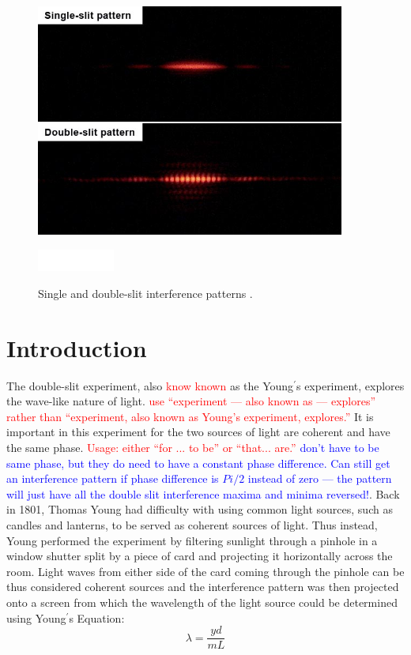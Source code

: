 \documentclass[prb,preprint]{revtex4-1}
\begin{document}
\begin{abstract}
\end{abstract}

\begin{figure}[b]
\centering
\includegraphics[width=4in]{image1.jpg}
\caption{Single and double-slit interference patterns \cite{wik}.}
\includegraphics[width=1in]{white.png}
\label{image}
\end{figure}

\maketitle 

\section{Introduction}
The double-slit experiment, also \textcolor{red}{know known} as the Young$^\prime$s experiment, explores the wave-like nature of light. \textcolor{red}{use ``experiment --- also known as --- explores'' rather than ``experiment, also known as Young's experiment, explores.''} It is important in this experiment for the two sources of light are coherent and have the same phase.\textcolor{red}{ Usage: either ``for ... to be'' or ``that... are.''} \textcolor{blue}{don't have to be same phase, but they do need to have a constant phase difference. Can still get an interference pattern if phase difference is $Pi/2$ instead of zero --- the pattern will just have all the double slit interference maxima and minima reversed!}. Back in 1801, Thomas Young had difficulty with using common light sources, such as candles and lanterns, to be served as coherent sources of light. Thus instead, Young performed the experiment by filtering sunlight through a pinhole in a window shutter split by a piece of card and projecting it horizontally across the room. Light waves from either side of the card coming through the pinhole can be thus considered coherent sources and the interference pattern was then projected onto a screen from which the wavelength of the light source could be determined using Young$^\prime$s Equation: $$\lambda=\frac{y d}{m L}$$
\end{document}
